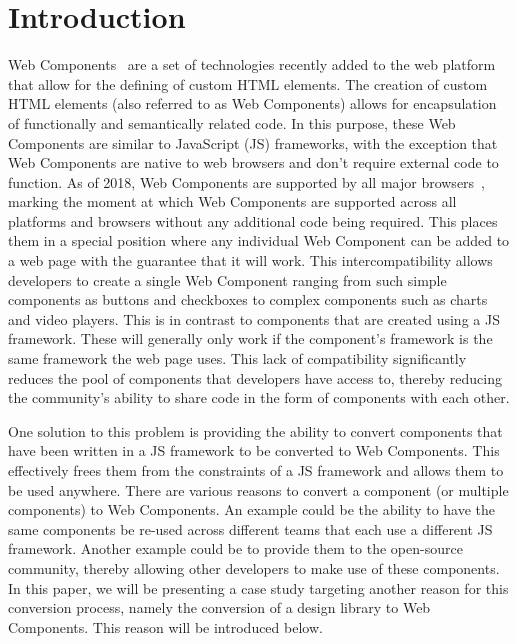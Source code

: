 \chapter{Introduction}
Web Components~ are a set of technologies recently added to the web platform that allow for the defining of custom HTML elements. The creation of custom HTML elements (also referred to as Web Components) allows for encapsulation of functionally and semantically related code. In this purpose, these Web Components are similar to JavaScript (JS) frameworks, with the exception that Web Components are native to web browsers and don't require external code to function. As of 2018, Web Components are supported by all major browsers~, marking the moment at which Web Components are supported across all platforms and browsers without any additional code being required. This places them in a special position where any individual Web Component can be added to a web page with the guarantee that it will work. This intercompatibility allows developers to create a single Web Component ranging from such simple components as buttons and checkboxes to complex components such as charts and video players. This is in contrast to components that are created using a JS framework. These will generally only work if the component's framework is the same framework the web page uses. This lack of compatibility significantly reduces the pool of components that developers have access to, thereby reducing the community's ability to share code in the form of components with each other.

One solution to this problem is providing the ability to convert components that have been written in a JS framework to be converted to Web Components. This effectively frees them from the constraints of a JS framework and allows them to be used anywhere. There are various reasons to convert a component (or multiple components) to Web Components. An example could be the ability to have the same components be re-used across different teams that each use a different JS framework. Another example could be to provide them to the open-source community, thereby allowing other developers to make use of these components. In this paper, we will be presenting a case study targeting another reason for this conversion process, namely the conversion of a design library to Web Components. This reason will be introduced below.

